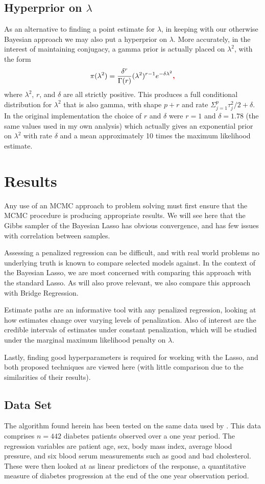 \documentclass{uwstat572}
\newcommand{\vmadd}[1]{\textbf{\color{red}{#1}}}
\begin{document}
\subsection{Hyperprior on $\lambda$}
As an alternative to finding a point estimate for $\lambda$, in keeping with our otherwise Bayesian approach we may also put a hyperprior on $\lambda$. More accurately, in the interest of maintaining conjugacy, a gamma prior is actually placed on $\lambda^2$, with the form\[
\pi(\lambda^2)=\frac{\delta^r}{\Gamma(r)}(\lambda^2)^{r-1}e^{-\delta\lambda^2}\vmadd{,}
\] where $\lambda^2$, $r$, and $\delta$ are all strictly positive. This produces a full conditional distribution for $\lambda^2$ that is also gamma, with shape $p+r$ and rate $\Sigma^p_{j=1}\tau^2_j/2+\delta$. In the original implementation the choice of $r$ and $\delta$ were $r=1$ and $\delta=1.78$ (the same values used in my own analysis)\vmadd{,} which actually gives an exponential prior on $\lambda^2$ with rate $\delta$ and a mean approximately 10 times the maximum likelihood estimate.

\section{Results}
Any use of an MCMC approach to problem solving must first ensure that the MCMC procedure is producing appropriate results. We will see here that the Gibbs sampler of the Bayesian Lasso has obvious convergence, and has few issues with correlation between samples.

Assessing a penalized regression can be difficult, and with real world problems no underlying truth is known to compare selected models against. In the context of the Bayesian Lasso, we are most concerned with comparing this approach with the standard Lasso. As will also prove relevant, we also compare this approach with Bridge Regression. 

Estimate paths are an informative tool with any penalized regression, looking at how estimates change over varying levels of penalization. Also of interest are the credible intervals of estimates under constant penalization, which will be studied under the marginal maximum likelihood penalty on $\lambda$.

Lastly, finding good hyperparameters is required for working with the Lasso, and both proposed techniques are viewed here (with little comparison due to the similarities of their results).

\subsection{Data Set}
The algorithm found herein has been tested on the same data used by \cite{efron2004least}. This data comprises $n=442$ diabetes patients observed over a one year period. The regression variables are patient age, sex, body mass index, average blood pressure, and six blood serum measurements such as good and bad cholesterol. These were then looked at as linear predictors of the response, a quantitative measure of diabetes progression at the end of the one year observation period.
\end{document}
